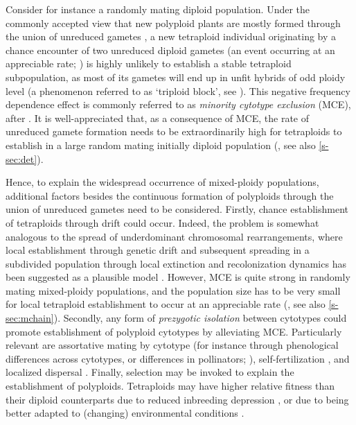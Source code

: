 \documentclass[12pt,a4paper]{article}
\begin{document}
Consider for instance a randomly mating diploid population.
Under the commonly accepted view that new polyploid plants are mostly formed
through the union of unreduced gametes
\citep{bretagnolle1995,herben2016,kreiner2017b}, a new tetraploid individual
originating by a chance encounter of two unreduced diploid gametes (an event
occurring at an appreciable rate; \cite{kreiner2017}) is highly unlikely to
establish a stable tetraploid subpopulation, as most of its gametes will end up
in unfit hybrids of odd ploidy level (a phenomenon referred to as `triploid
block', see \cite{ramsey1998,kohler2010,brown2024}).
This negative frequency dependence effect is commonly referred to as
\textit{minority cytotype exclusion} (MCE), after \cite{levin1975}.
It is well-appreciated that, as a consequence of MCE, the rate of unreduced
gamete formation needs to be extraordinarily high for tetraploids to establish
in a large random mating initially diploid population (\cite{felber1997}, see
also \cref{s-sec:det}).

Hence, to explain the widespread occurrence of mixed-ploidy populations,
additional factors besides the continuous formation of polyploids through the
union of unreduced gametes need to be considered.
Firstly, chance establishment of tetraploids through drift could occur.
Indeed, the problem is somewhat analogous to the spread of underdominant
chromosomal rearrangements, where local establishment through genetic drift and
subsequent spreading in a subdivided population through local extinction and 
recolonization dynamics has been suggested as a plausible model
\citep{lande1985}.
However, MCE is quite strong in randomly mating mixed-ploidy populations, and
the population size has to be very small for local tetraploid establishment to
occur at an appreciable rate (\cite{rausch2005}, see also \cref{s-sec:mchain}).
Secondly, any form of \textit{prezygotic isolation} between cytotypes could
promote establishment of polyploid cytotypes by alleviating MCE.
Particularly relevant are assortative mating by cytotype  (for instance through
phenological differences across cytotypes, or differences in pollinators;
\cite{kolar2017}), self-fertilization \citep{rausch2005,novikova2023}, and
localized dispersal \citep{baack2005,kolar2017}.
Finally, selection may be invoked to explain the establishment of polyploids.
Tetraploids may have higher relative fitness than their diploid counterparts
due to reduced inbreeding depression \citep{ronfort1999}, or due to being
better adapted to (changing) environmental conditions \citep{vandepeer2021}. 
\end{document}

